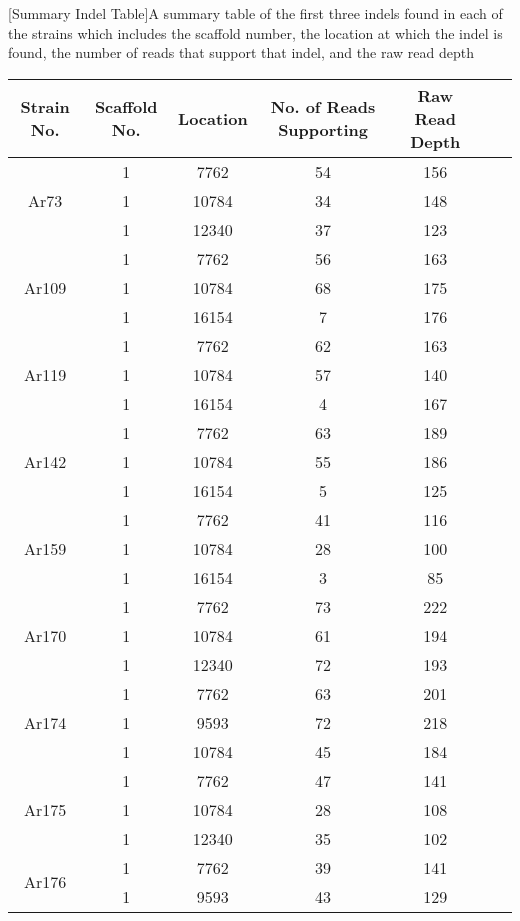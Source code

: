 \documentclass[../main.tex]{subfiles}
\begin{document}
\begin{table}[H]
\begin{center}
	[Summary Indel Table]{A summary table of the first three indels found in each of the strains which includes the scaffold number, the location at which the indel is found, the number of reads that support that indel, and the raw read depth}
	\begin{tabular}{ |c|c|c|c|c|c|c| } 
		\hline
		Strain No. & Scaffold No. & Location & No. of Reads Supporting & Raw Read Depth \\
		\hline
		\multirow{3}{4em}{Ar73} & 1 & 7762 &54 & 156\\
		&1 & 10784 & 34 & 148\\
		&1 & 12340 & 37 & 123\\
		\hline
		\multirow{3}{4em}{Ar109} & 1 & 7762 & 56 & 163\\
		& 1 & 10784 & 68 & 175 \\
		& 1 & 16154 & 7 & 176 \\
		\hline
		\multirow{3}{4em}{Ar119} & 1 & 7762 & 62 & 163 \\
		& 1 & 10784 & 57 & 140 \\
		& 1 & 16154 & 4 & 167 \\
		\hline
		\multirow{3}{4em}{Ar142} & 1 & 7762 & 63 & 189 \\
		& 1 & 10784 & 55 & 186 \\
		& 1 & 16154 & 5 & 125 \\
		\multirow{3}{4em}{Ar159} & 1 & 7762 & 41 & 116 \\ 
		& 1 & 10784 & 28 & 100  \\ 
		& 1 & 16154 & 3 & 85 \\ 
		\hline
		\multirow{3}{4em}{Ar170} & 1 & 7762 & 73 & 222 \\ 
		& 1 & 10784 & 61 & 194  \\ 
		& 1 & 12340 & 72 & 193 \\ 
		\hline
		\multirow{3}{4em}{Ar174} & 1 & 7762 & 63 & 201 \\ 
		& 1 & 9593 & 72 & 218  \\ 
		& 1 & 10784 & 45 & 184 \\ 
		\hline
		\multirow{3}{4em}{Ar175} & 1 & 7762 & 47 & 141 \\ 
		& 1 & 10784 & 28 & 108  \\ 
		& 1 & 12340 & 35 & 102 \\ 
		\hline
		\multirow{3}{4em}{Ar176} & 1 & 7762 & 39 & 141 \\ 
		& 1 & 9593 & 43 & 129  \\ 

\end{tabular}
\end{center}
\end{table}
\end{document}
